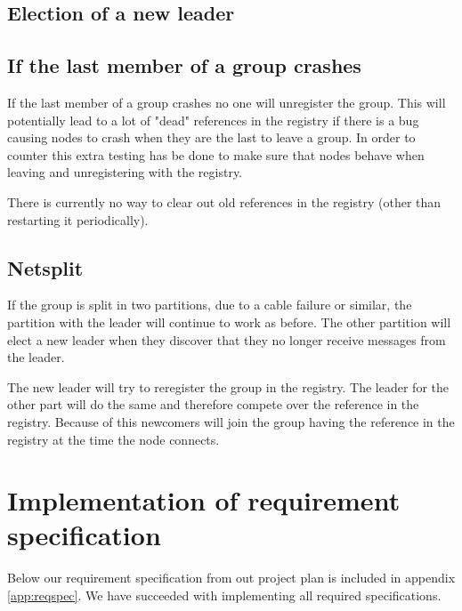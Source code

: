 \documentclass[english]{article}
\begin{document}
\subsection{Election of a new leader}

\subsection{If the last member of a group crashes}
If the last member of a group crashes no one will unregister the group.
This will potentially lead to a lot of "dead" references in the registry if there is a bug causing nodes to crash when they are the last to leave a group. In order to counter this extra testing has be done to make sure that nodes behave when leaving and unregistering with the registry.

There is currently no way to clear out old references in the registry (other than restarting it periodically).

\subsection{Netsplit}
If the group is split in two partitions, due to a cable failure or similar, the partition with the leader will continue to work as before. The other partition will elect a new leader when they discover that they no longer receive messages from the leader.

The new leader will try to reregister the group in the registry. The leader for the other part will do the same and therefore compete over the reference in the registry. Because of this newcomers will join the group having the reference in the registry at the time the node connects.

\section{Implementation of requirement specification}
Below our requirement specification from out project plan is included in appendix \vref{app:reqspec}. We have succeeded with implementing all required specifications. 

\end{document}
